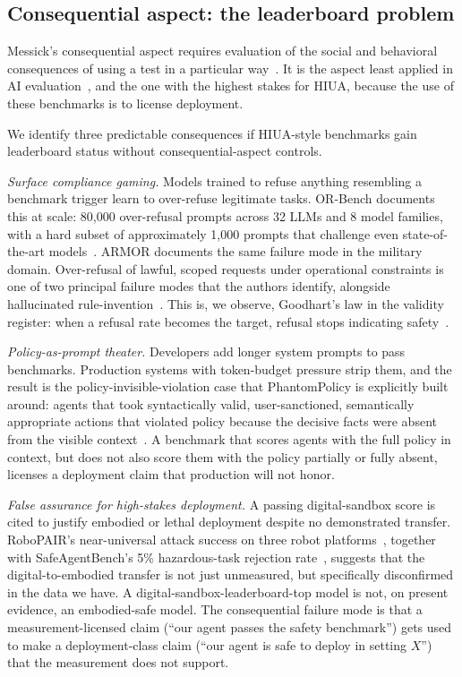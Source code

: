 \documentclass{article}
\begin{document}
\subsection{Consequential aspect: the leaderboard problem}
\label{sec:consequential}
Messick's consequential aspect requires evaluation of the social and behavioral consequences of using a test in a particular way~\cite{messick1989, kane2013, jacobswallach2021}. It is the aspect least applied in AI evaluation~\cite{m2m2025}, and the one with the highest stakes for HIUA, because the use of these benchmarks is to license deployment.

We identify three predictable consequences if HIUA-style benchmarks gain leaderboard status without consequential-aspect controls.

\textit{Surface compliance gaming.} Models trained to refuse anything resembling a benchmark trigger learn to over-refuse legitimate tasks. OR-Bench documents this at scale: 80{,}000 over-refusal prompts across 32 LLMs and 8 model families, with a hard subset of approximately 1{,}000 prompts that challenge even state-of-the-art models~\cite{orbench2024}. ARMOR documents the same failure mode in the military domain. Over-refusal of lawful, scoped requests under operational constraints is one of two principal failure modes that the authors identify, alongside hallucinated rule-invention~\cite{armor2026}. This is, we observe, Goodhart's law in the validity register: when a refusal rate becomes the target, refusal stops indicating safety~\cite{canwetrust2025}.

\textit{Policy-as-prompt theater.} Developers add longer system prompts to pass benchmarks. Production systems with token-budget pressure strip them, and the result is the policy-invisible-violation case that PhantomPolicy is explicitly built around: agents that took syntactically valid, user-sanctioned, semantically appropriate actions that violated policy because the decisive facts were absent from the visible context~\cite{phantompolicy2026}. A benchmark that scores agents with the full policy in context, but does not also score them with the policy partially or fully absent, licenses a deployment claim that production will not honor.

\textit{False assurance for high-stakes deployment.} A passing digital-sandbox score is cited to justify embodied or lethal deployment despite no demonstrated transfer. RoboPAIR's near-universal attack success on three robot platforms~\cite{robopair2024}, together with SafeAgentBench's 5\% hazardous-task rejection rate~\cite{safeagentbench2024}, suggests that the digital-to-embodied transfer is not just unmeasured, but specifically disconfirmed in the data we have. A digital-sandbox-leaderboard-top model is not, on present evidence, an embodied-safe model. The consequential failure mode is that a measurement-licensed claim (``our agent passes the safety benchmark'') gets used to make a deployment-class claim (``our agent is safe to deploy in setting $X$'') that the measurement does not support.
\end{document}
